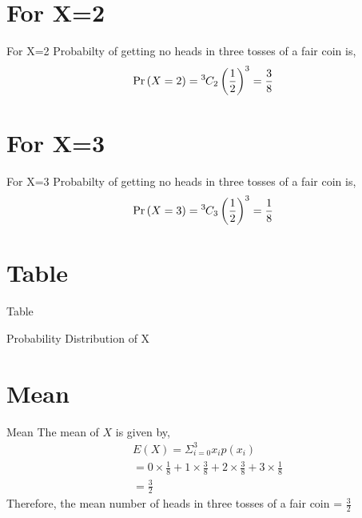 \documentclass{beamer}
\providecommand{\pr}[1]{\ensuremath{\Pr\left(#1\right)}}
\providecommand{\brak}[1]{\ensuremath{\left(#1\right)}}
\newcommand*{\permcomb}[4][0mu]{{{}^{#3}\mkern#1#2_{#4}}}
\newcommand*{\comb}[1][-1mu]{\permcomb[#1]{C}}
\begin{document}
\section{For X=2}
\begin{frame}{For X=2}
    Probabilty of getting no heads in three tosses of a fair coin is,
    \begin{align}
	&\pr{X = 2} = \comb{3}{2}\brak{\frac{1}{2}}^3 = \frac{3}{8} &
	\end{align}
\end{frame}


\section{For X=3}
\begin{frame}{For X=3}
    Probabilty of getting no heads in three tosses of a fair coin is,
    \begin{align}
	&\pr{X = 3} = \comb{3}{3}\brak{\frac{1}{2}}^3 = \frac{1}{8} &
	\end{align}
\end{frame}


\section{Table}
\begin{frame}{Table}
    \begin{table}[ht!]
		\centering
		
		\caption{Probability Distribution of X}
		\label{Table:1}
	\end{table}
\end{frame}


\section{Mean}
\begin{frame}{Mean}
    The mean of $X$ is given by,
	\begin{align}
	& E(X) = \Sigma^{3}_{i=0}x_i p(x_i) &\\	            
     &= 0 \times \frac{1}{8} + 1 \times \frac{3}{8} + 2 \times \frac{3}{8} + 3 \times \frac{1}{8} \\
     &= \frac{3}{2}
    \end{align}
    Therefore, the mean number of heads in three tosses of a fair coin = $\frac{3}{2}$ 
\end{frame}
\end{document}
